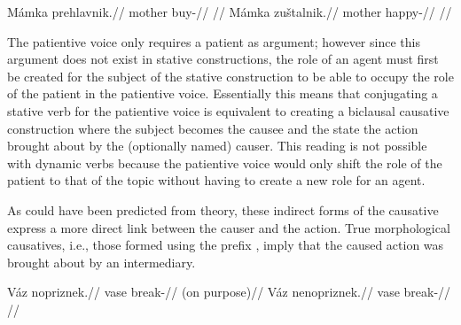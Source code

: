 \pex
\a
\begingl
    \gla \ljudge{*}M\'amka prehlavnik.//
    \glb mother buy-//
    \glft {}//
\endgl
\a
\begingl
    \gla M\'amka zu\v{s}talnik.//
    \glb mother happy-//
    \glft {}//
\endgl
\xe

The patientive voice only requires a patient as argument; however since this argument does not exist in stative constructions, the role of an agent must first be created for the subject of the stative construction to be able to occupy the role of the patient in the patientive voice. Essentially this means that conjugating a stative verb for the patientive voice is equivalent to creating a biclausal causative construction where the subject becomes the causee and the state the action brought about by the (optionally named) causer. This reading is not possible with dynamic verbs because the patientive voice would only shift the role of the patient to that of the topic without having to create a new role for an agent.

As could have been predicted from  theory, these indirect forms of the causative express a more direct link between the causer and the action. True morphological causatives, i.e., those formed using the prefix , imply that the caused action was brought about by an intermediary.

\pex
\a
\begingl
\gla V\'az nopriznek.//
\glb vase break-//
\glft {} (on purpose)//
\endgl
\a
\begingl
\gla V\'az nenopriznek.//
\glb vase break-//
\glft {}//
\endgl
\xe

